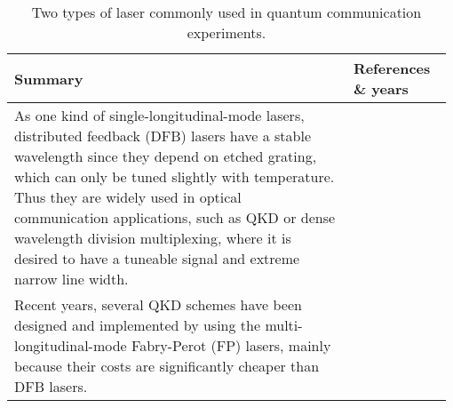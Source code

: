 \begin{table*}[!htbp]
	\begin{tabular}{|p{0.755\linewidth}|p{0.22\linewidth}|}
		\hline
		\textbf{Summary} & \textbf{References \& years} \\
		\hline \hline
		 As one kind of single-longitudinal-mode lasers, distributed feedback (DFB) lasers have a stable wavelength since they depend on etched grating, which can only be tuned slightly with temperature. Thus they are widely used in optical communication applications, such as QKD or dense wavelength division multiplexing, where it is desired to have a tuneable signal and extreme narrow line width. & \cite{bib:sun2016quantum, bib:liao2017long} \\
		\hline
		 Recent years, several QKD schemes have been designed and implemented by using the multi-longitudinal-mode Fabry-Perot (FP) lasers, mainly because their costs are significantly cheaper than DFB lasers. &  \cite{bib:choi2011quantum,  bib:wang2015experimental} \\
        \hline
	\end{tabular}
	\captionspacetab \caption{Two types of laser commonly used in quantum communication experiments.} \label{tab:coherent_states}
\end{table*}


